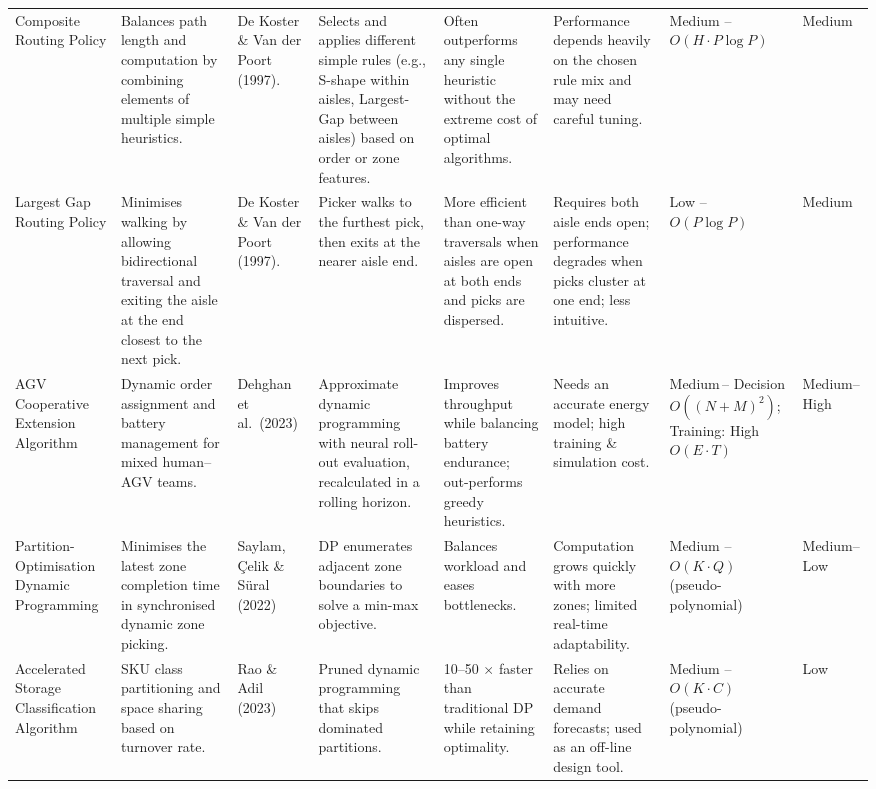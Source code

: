 \documentclass[journal]{IEEEtran}
\begin{document}
\begin{table*}[t!]
{\begin{tabular}{p{2.7cm}p{4.9cm}p{3.2cm}p{4.8cm}p{3.8cm}p{4.2cm}p{2.8cm}p{3.2cm}}
      Composite Routing Policy &
      Balances path length and computation by combining elements of multiple simple heuristics. &
      De Koster \& Van der Poort (1997). &
      Selects and applies different simple rules (e.g., S-shape within aisles, Largest-Gap between aisles) based on order or zone features. &
      Often outperforms any single heuristic without the extreme cost of optimal algorithms. &
      Performance depends heavily on the chosen rule mix and may need careful tuning. &
      Medium -- $O(H\!\cdot\!P\log P)$ & Medium \\[2pt]

      Largest Gap Routing Policy &
      Minimises walking by allowing bidirectional traversal and exiting the aisle at the end closest to the next pick. &
      De Koster \& Van der Poort (1997). &
      Picker walks to the furthest pick, then exits at the nearer aisle end. &
      More efficient than one-way traversals when aisles are open at both ends and picks are dispersed. &
      Requires both aisle ends open; performance degrades when picks cluster at one end; less intuitive. &
      Low -- $O(P\log P)$ & Medium \\[2pt]

      AGV Cooperative Extension Algorithm &
      Dynamic order assignment and battery management for mixed human–AGV teams. &
      Dehghan et al.\ (2023) &
      Approximate dynamic programming with neural roll-out evaluation, recalculated in a rolling horizon. &
      Improves throughput while balancing battery endurance; out-performs greedy heuristics. &
      Needs an accurate energy model; high training \& simulation cost. &
      Medium\,-- Decision $O((N+M)^{2})$; Training: High $O(E\!\cdot\!T)$ & Medium–High \\[2pt]

      Partition-Optimisation Dynamic Programming &
      Minimises the latest zone completion time in synchronised dynamic zone picking. &
      Saylam, Çelik \& Süral (2022) &
      DP enumerates adjacent zone boundaries to solve a min-max objective. &
      Balances workload and eases bottlenecks. &
      Computation grows quickly with more zones; limited real-time adaptability. &
      Medium -- $O(K\!\cdot\!Q)$ (pseudo-polynomial) & Medium–Low \\[2pt]

      Accelerated Storage Classification Algorithm &
      SKU class partitioning and space sharing based on turnover rate. &
      Rao \& Adil (2023) &
      Pruned dynamic programming that skips dominated partitions. &
      10--50 $\times$ faster than traditional DP while retaining optimality. &
      Relies on accurate demand forecasts; used as an off-line design tool. &
      Medium -- $O(K\!\cdot\!C)$ (pseudo-polynomial) & Low \\[2pt]


\end{tabular}}
\end{table*}
\end{document}

